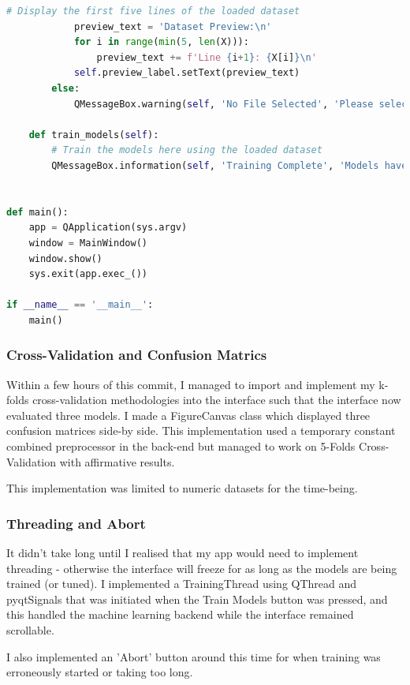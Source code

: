 \documentclass[letterpaper,10pt]{article}
\begin{document}
\begin{lstlisting}[language=Python, caption=ui.py - Initial Effort with file loading. Mostly a dummy interface.]
            # Display the first five lines of the loaded dataset
            preview_text = 'Dataset Preview:\n'
            for i in range(min(5, len(X))):
                preview_text += f'Line {i+1}: {X[i]}\n'
            self.preview_label.setText(preview_text)
        else:
            QMessageBox.warning(self, 'No File Selected', 'Please select a dataset file.')
    
    def train_models(self):
        # Train the models here using the loaded dataset
        QMessageBox.information(self, 'Training Complete', 'Models have been trained successfully.')
    

def main():
    app = QApplication(sys.argv)
    window = MainWindow()
    window.show()
    sys.exit(app.exec_())

if __name__ == '__main__':
    main()

\end{lstlisting}

\subsubsection{Cross-Validation and Confusion Matrics}
Within a few hours of this commit, I managed to import and implement my k-folds cross-validation methodologies into the interface such that the interface now evaluated three models. I made a FigureCanvas class which displayed three confusion matrices side-by side. This implementation used a temporary constant combined preprocessor in the back-end but managed to work on 5-Folds Cross-Validation with affirmative results. \par
This implementation was limited to numeric datasets for the time-being. \par

\subsubsection{Threading and Abort}
It didn't take long until I realised that my app would need to implement threading - otherwise the interface will freeze for as long as the models are being trained (or tuned). I implemented a TrainingThread using QThread and pyqtSignals that was initiated when the Train Models button was pressed, and this handled the machine learning backend while the interface remained scrollable. \par
I also implemented an 'Abort' button around this time for when training was erroneously started or taking too long. \par
\end{document}
